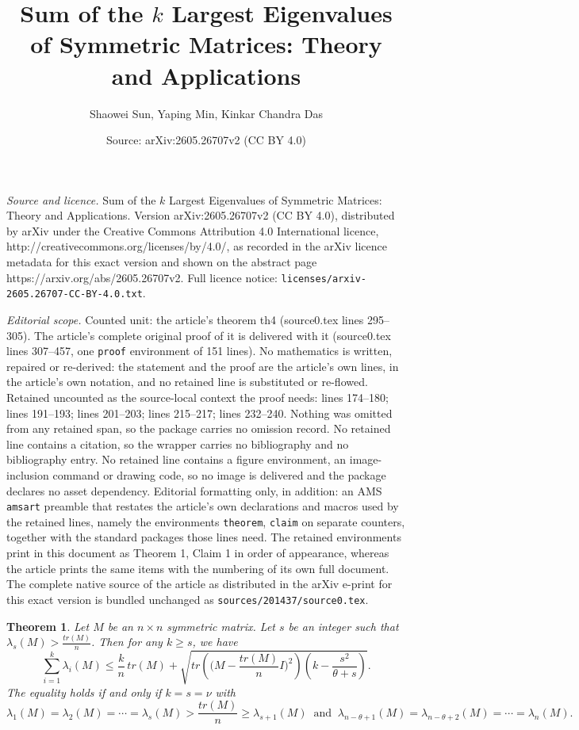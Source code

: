 \documentclass[10pt,a4paper]{amsart}
\title{Sum of the $k$ Largest Eigenvalues of Symmetric Matrices: Theory and Applications}
\author{Shaowei Sun, Yaping Min, Kinkar Chandra Das}
\date{Source: arXiv:2605.26707v2 (CC BY 4.0)}
\newtheorem{theorem}{Theorem}
\begin{document}
\maketitle

\noindent\emph{Source and licence.} Sum of the $k$ Largest Eigenvalues of Symmetric Matrices: Theory and Applications. Version arXiv:2605.26707v2 (CC BY 4.0), distributed by arXiv under the Creative Commons Attribution 4.0 International licence, http://creativecommons.org/licenses/by/4.0/, as recorded in the arXiv licence metadata for this exact version and shown on the abstract page https://arxiv.org/abs/2605.26707v2. Full licence notice: \texttt{licenses/arxiv-2605.26707-CC-BY-4.0.txt}.\par\smallskip

\noindent\textit{Editorial scope.} Counted unit: the article's theorem th4 (source0.tex lines 295--305). The article's complete original proof of it is delivered with it (source0.tex lines 307--457, one \texttt{proof} environment of 151 lines). No mathematics is written, repaired or re-derived: the statement and the proof are the article's own lines, in the article's own notation, and no retained line is substituted or re-flowed.  Retained uncounted as the source-local context the proof needs: lines 174--180; lines 191--193; lines 201--203; lines 215--217; lines 232--240.  Nothing was omitted from any retained span, so the package carries no omission record.  No retained line contains a citation, so the wrapper carries no bibliography and no bibliography entry.  No retained line contains a figure environment, an image-inclusion command or drawing code, so no image is delivered and the package declares no asset dependency.  Editorial formatting only, in addition: an AMS \texttt{amsart} preamble that restates the article's own declarations and macros used by the retained lines, namely the environments \texttt{theorem}, \texttt{claim} on separate counters, together with the standard packages those lines need.  The retained environments print in this document as Theorem 1, Claim 1 in order of appearance, whereas the article prints the same items with the numbering of its own full document.  The complete native source of the article as distributed in the arXiv e-print for this exact version is bundled unchanged as \texttt{sources/201437/source0.tex}.
 \begin{theorem} \label{th1} Let $M$ be an $n\times n$ symmetric matrix. Let $s$ be an integer such that $\lambda_s(M)>\frac{tr(M)}{n}$. Then for any $k\geq s$, we have
 \begin{equation}
 \sum_{i=1}^{k}\lambda_i(M)\leq\frac{k}{n}\,tr(M)+\sqrt{tr\left(\Big(M-\frac{tr(M)}{n}I\Big)^2\right)\left(k-\frac{s^2}{\theta+s}\right)}. \label{e1}
 \end{equation}
 The equality holds if and only if  $k=s=\nu$ with 
 $$\lambda_1(M)=\lambda_2(M)=\cdots=\lambda_s(M)>\frac{tr(M)}{n}\geq \lambda_{s+1}(M)~\mbox{ and }~\lambda_{n-\theta+1}(M)=\lambda_{n-\theta+2}(M)=\cdots=\lambda_n(M).$$
 \end{theorem}
\end{document}
